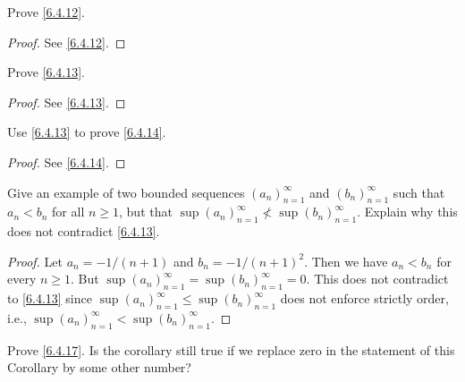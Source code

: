 \begin{ex}\label{ex:6.4.3}
  Prove \cref{6.4.12}.
\end{ex}

\begin{proof}
  See \cref{6.4.12}.
\end{proof}

\begin{ex}\label{ex:6.4.4}
  Prove \cref{6.4.13}.
\end{ex}

\begin{proof}
  See \cref{6.4.13}.
\end{proof}

\begin{ex}\label{ex:6.4.5}
  Use \cref{6.4.13} to prove \cref{6.4.14}.
\end{ex}

\begin{proof}
  See \cref{6.4.14}.
\end{proof}

\begin{ex}\label{ex:6.4.6}
  Give an example of two bounded sequences \((a_n)_{n = 1}^\infty\) and \((b_n)_{n = 1}^\infty\) such that \(a_n < b_n\) for all \(n \geq 1\), but that \(\sup(a_n)_{n = 1}^\infty \not< \sup(b_n)_{n = 1}^\infty\).
  Explain why this does not contradict \cref{6.4.13}.
\end{ex}

\begin{proof}
  Let \(a_n = -1 / (n + 1)\) and \(b_n = -1 / (n + 1)^2\).
  Then we have \(a_n < b_n\) for every \(n \geq 1\).
  But \(\sup(a_n)_{n = 1}^\infty = \sup(b_n)_{n = 1}^\infty = 0\).
  This does not contradict to \cref{6.4.13} since \(\sup(a_n)_{n = 1}^\infty \leq \sup(b_n)_{n = 1}^\infty\) does not enforce strictly order, i.e., \(\sup(a_n)_{n = 1}^\infty < \sup(b_n)_{n = 1}^\infty\).
\end{proof}

\begin{ex}\label{ex:6.4.7}
  Prove \cref{6.4.17}.
  Is the corollary still true if we replace zero in the statement of this Corollary by some other number?
\end{ex}

